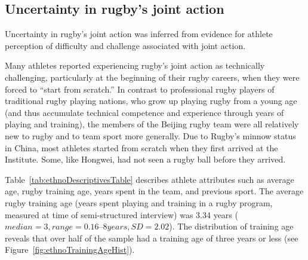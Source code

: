 \begin{CJK}{UTF8}{gbsn}
\subsection{Uncertainty in rugby's joint action\label{sect:uncertaintyAthlete}}

Uncertainty in rugby's joint action was inferred from evidence for athlete perception of difficulty and challenge associated with joint action.

Many athletes reported experiencing rugby's joint action as technically challenging, particularly at the beginning of their rugby careers, when they were forced to ``start from scratch.''  In contrast to professional rugby players of traditional rugby playing nations, who grow up playing rugby from a young age (and thus accumulate technical competence and experience through years of playing and training), the members of the Beijing rugby team were all relatively new to rugby and to team sport more generally.   Due to Rugby's minnow status in China, most athletes started from scratch when they first arrived at the Institute.  Some, like Hongwei, had not seen a rugby ball before they arrived.

Table~\ref{tab:ethnoDescriptivesTable} describes athlete attributes such as average age, rugby training age, years spent in the team, and previous sport.  The average rugby training age (years spent playing and training in a rugby program, measured at time of semi-structured interview) was 3.34 years ($median = 3, range = 0.16 – 8 years, SD = 2.02$). The distribution of training age reveals that over half of the sample had a training age of three years or less (see Figure~\ref{fig:ethnoTrainingAgeHist}).






\end{CJK}
